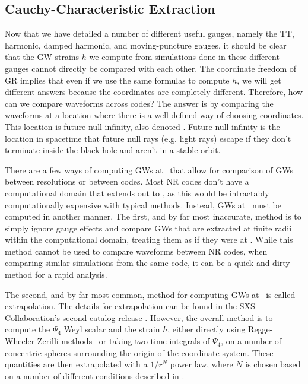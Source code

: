\begin{bibunit}[unsrtnat]
\section{Cauchy-Characteristic Extraction}

Now that we have detailed a number of different useful gauges, namely the TT,
harmonic, damped harmonic, and moving-puncture gauges, it should be clear that
the GW strains $h$ we compute from simulations done in these different gauges
cannot directly be compared with each other. The coordinate freedom of GR
implies that even if we use the same formulas to compute $h$, we will get
different answers because the coordinates are completely different. Therefore,
how can we compare waveforms across codes? The answer is by comparing the
waveforms at a location where there is a well-defined way of choosing
coordinates. This location is future-null infinity, also denoted \scri.
Future-null infinity is the location in spacetime that future null rays (e.g.
light rays) escape if they don't terminate inside the black hole and aren't in a
stable orbit.

There are a few ways of computing GWs at \scri~that allow for comparison of GWs
between resolutions or between codes. Most NR codes don't have a computational
domain that extends out to \scri, as this would be intractably computationally
expensive with typical methods. Instead, GWs at \scri~must be computed in
another manner. The first, and by far most inaccurate, method is to simply
ignore gauge effects and compare GWs that are extracted at finite radii within
the computational domain, treating them as if they were at \scri. While this
method cannot be used to compare waveforms between NR codes, when comparing
similar simulations from the same code, it can be a quick-and-dirty method for a
rapid analysis.

The second, and by far most common, method for computing GWs at \scri~is called
extrapolation. The details for extrapolation can be found in the SXS
Collaboration's second catalog release \cite{Boyle:2019kee}. However, the overall
method is to compute the $\Psi_4$ Weyl scalar and the strain $h$, either
directly using Regge-Wheeler-Zerilli methods~\cite{Sarbach:2001PhysRevD,Regge:1957PhysRev,Zerilli:1970PhysRevLett} or taking two time integrals of $\Psi_4$, on a number of
concentric spheres surrounding the origin of the coordinate system. These
quantities are then extrapolated with a $1/r^N$ power law, where $N$ is chosen
based on a number of different conditions described in \cite{Boyle:2019kee}.


\end{bibunit}
